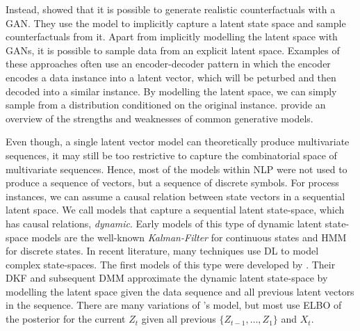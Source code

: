 \documentclass[./../../paper.tex]{subfiles}
\begin{document}
Instead, \citeauthor{robeer_GeneratingRealisticNatural_2021} showed that it is possible to generate realistic counterfactuals with a \gls{GAN}\autocite{robeer_GeneratingRealisticNatural_2021}. They use the model to implicitly capture a latent state space and sample counterfactuals from it. Apart from implicitly modelling the latent space with \glspl{GAN}, it is possible to sample data from an explicit latent space. Examples of these approaches often use an encoder-decoder pattern in which the encoder encodes a data instance into a latent vector, which will be peturbed and then decoded into a similar instance\autocites{melnyk_ImprovedNeuralText_2017,wang_Controllableunsupervisedtext_2019}. By modelling the latent space, we can simply sample from a distribution conditioned on the original instance. \citeauthor{bond-taylor_DeepGenerativeModelling_2021} provide an overview of the strengths and weaknesses of common generative models.

Even though, a single latent vector model can theoretically produce multivariate sequences, it may still be too restrictive to capture the combinatorial space of multivariate sequences. Hence, most of the models within \gls{NLP} were not used to produce a sequence of vectors, but a sequence of discrete symbols. For process instances, we can assume a causal relation between state vectors in a sequential latent space. We call models that capture a sequential latent state-space, which has causal relations, \emph{dynamic}\autocite{leglaive_RecurrentVariationalAutoencoder_2020}. Early models of this type of dynamic latent state-space models are the well-known \emph{Kalman-Filter} for continuous states and \gls{HMM} for discrete states. In recent literature, many techniques use \gls{DL} to model complex state-spaces. The first models of this type were developed by \citeauthor{krishnan_StructuredInferenceNetworks_2017}\autocite{krause_InteractingPredictionsVisual_2016, krishnan_StructuredInferenceNetworks_2017}. Their \gls{DKF} and subsequent \gls{DMM} approximate the dynamic latent state-space by modelling the latent space given the data sequence and all previous latent vectors in the sequence. There are many variations\autocites{chung_RecurrentLatentVariable_2016,fraccaro_Sequentialneuralmodels_2016,leglaive_RecurrentVariationalAutoencoder_2020} of \citeauthor{krishnan_StructuredInferenceNetworks_2017}'s model, but most use \gls{ELBO} of the posterior for the current $Z_{t}$ given all previous $\{Z_{t-1},\ldots,Z_{1}\}$ and $X_{t}$\autocite{girin_DynamicalVariationalAutoencoders_2021}.
\end{document}
